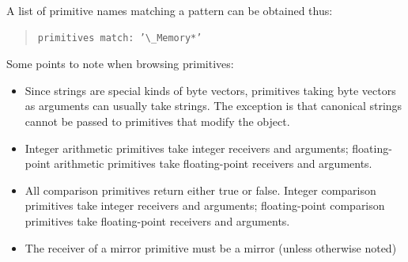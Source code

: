\documentclass[letterpaper,10pt,english]{sphinxmanual}
\begin{document}
A list of primitive names matching a pattern can be obtained thus:
\begin{quote}

\begin{Verbatim}[commandchars=\\\{\}]
primitives match: ’\_Memory*’
\end{Verbatim}
\end{quote}

Some points to note when browsing primitives:
\begin{itemize}
\item {} 
Since strings are special kinds of byte vectors, primitives taking byte vectors as arguments
can usually take strings. The exception is that canonical strings cannot be passed to primitives
that modify the object.

\item {} 
Integer arithmetic primitives take integer receivers and arguments; floating-point arithmetic
primitives take floating-point receivers and arguments.

\item {} 
All comparison primitives return either true or false. Integer comparison primitives take integer
receivers and arguments; floating-point comparison primitives take floating-point receivers
and arguments.

\item {} 
The receiver of a mirror primitive must be a mirror (unless otherwise noted)

\end{itemize}



\renewcommand{\indexname}{Index}
\printindex
\end{document}

